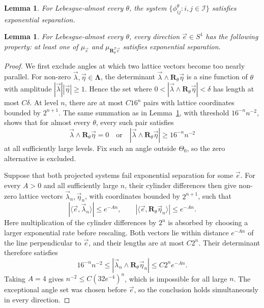 \documentclass[10pt,a4paper]{amsart}
\newtheorem{lemma}[theorem]{Lemma}
\begin{document}
\begin{lemma}
\label{lem:ae-exp-sep}
For Lebesgue-almost every $\theta$, the system $\{\phi_{ij}^{\theta}:i,j\in\mathcal I\}$ satisfies exponential separation.
\end{lemma}

\begin{lemma}
\label{lem:ae-dichotomy}
For Lebesgue-almost every $\theta$, every direction $\vec e\in S^1$ has the following property: at least one of $\mu_{\vec e}$ and $\mu_{\mathbf R_\theta^T\vec e}$ satisfies exponential separation.
\end{lemma}

\begin{proof}
We first exclude angles at which two lattice vectors become too nearly parallel.
For non-zero $\vec\lambda,\vec\eta\in\boldsymbol\Lambda$, the determinant $\vec\lambda\wedge\mathbf R_\theta\vec\eta$ is a sine function of $\theta$ with amplitude $|\vec\lambda||\vec\eta|\ge1$.
Hence the set where $0<|\vec\lambda\wedge\mathbf R_\theta\vec\eta|<\delta$ has length at most $C\delta$.
At level $n$, there are at most $C16^n$ pairs with lattice coordinates bounded by $2^{n+1}$.
The same summation as in Lemma~\ref{lem:ae-exp-sep}, with threshold $16^{-n}n^{-2}$, shows that for almost every $\theta$, every such pair satisfies
\[
\vec\lambda\wedge\mathbf R_\theta\vec\eta=0
\quad\text{or}\quad
|\vec\lambda\wedge\mathbf R_\theta\vec\eta|\ge16^{-n}n^{-2}
\]
at all sufficiently large levels.
Fix such an angle outside $\Theta_0$, so the zero alternative is excluded.

Suppose that both projected systems fail exponential separation for some $\vec e$.
For every $A>0$ and all sufficiently large $n$, their cylinder differences then give non-zero lattice vectors $\vec\lambda_n,\vec\eta_n$, with coordinates bounded by $2^{n+1}$, such that
\[
|\langle\vec e,\vec\lambda_n\rangle|\le e^{-An},
\qquad
|\langle\vec e,\mathbf R_\theta\vec\eta_n\rangle|\le e^{-An}.
\]
Here multiplication of the cylinder differences by $2^n$ is absorbed by choosing a larger exponential rate before rescaling.
Both vectors lie within distance $e^{-An}$ of the line perpendicular to $\vec e$, and their lengths are at most $C2^n$.
Their determinant therefore satisfies
\[
16^{-n}n^{-2}
\le |\vec\lambda_n\wedge\mathbf R_\theta\vec\eta_n|
\le C2^ne^{-An}.
\]
Taking $A=4$ gives $n^{-2}\le C(32e^{-4})^n$, which is impossible for all large $n$.
The exceptional angle set was chosen before $\vec e$, so the conclusion holds simultaneously in every direction.
\end{proof}
\end{document}
